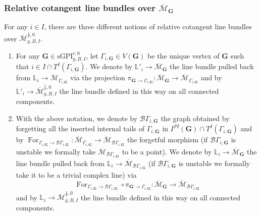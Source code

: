 \documentclass[11pt]{amsart}
\theoremstyle{definition}
\theoremstyle{remark}
\newcommand{\<}{\left<}
\renewcommand{\>}{\right>}
\numberwithin{equation}{section}
\def\Mbar{{\overline{\mathcal M}}}
\def\sGPI{\text{sGPI}}
\begin{document}
\subsubsection{Relative cotangent line bundles over $\Mbar_\mathbf{G}$}\label{sec uni cotangent line over glued moduli}
For any $i\in I$, there are three different notions of relative cotangent line bundles over $\Mbar^{\frac{1}{r},0}_{g,B,I}$.
\begin{enumerate}
    \item 
    For any $\bm{G} \in \sGPI^{r,0}_{g,B,I}$, let $\Gamma_{i,\bm{G}}\in V(\bm{G})$ be the unique vertex of $\bm{G}$ such that %
$i\in I \cap T^I(\Gamma_{i,\bm{G}})$. We denote %
by $\mathbb L'_i\to \Mbar_{\bm{G}}$ the line bundle pulled back from $\mathbb L_i\to \Mbar_{\Gamma_{i,\bm{G}}}$ via the projection %
$\pi_{\bm{G}\to \Gamma_{i,\bm{G}}}\colon \Mbar_{\bm{G}}\to \Mbar_{\Gamma_{i,\bm{G}}}$ and %
by $\mathbb L'_i\to \Mbar^{\frac{1}{r},0}_{g,B,I}$ the line bundle defined in this way on all connected components.
    \item With the above notation, we denote by $\mathcal B \Gamma_{i,\bm{G}}$ the graph obtained by forgetting all the inserted internal tails of $\Gamma_{i,\bm{G}}$ in $I^{PI}(\bm{G})\cap T^I(\Gamma_{i,\bm{G}})$ and by $\operatorname{For}_{\Gamma_{i,\bm{G}}\to \mathcal B\Gamma_{i,\bm{G}}}\colon \Mbar_{\Gamma_{i,\bm{G}}}\to \Mbar_{\mathcal B \Gamma_{i,\bm{G}}}$ the forgetful morphism (if $\mathcal B \Gamma_{i,\bm{G}}$ is unstable we formally take $\Mbar_{\mathcal B \Gamma_{i,\bm{G}}}$ to be a point). We denote by $\mathbb L_i\to \Mbar_{\bm{G}}$ the line bundle pulled back from $\mathbb L_i\to \Mbar_{\mathcal B\Gamma_{i,\bm{G}}}$ (if $\mathcal B \Gamma_{i,\bm{G}}$ is unstable we formally take it to be a trivial complex line) via 
    $$\operatorname{For}_{\Gamma_{i,\bm{G}}\to \mathcal B\Gamma_{i,\bm{G}}}\circ \pi_{\bm{G}\to \Gamma_{i,\bm{G}}} \colon \Mbar_{\bm{G}} \to \Mbar_{\mathcal B\Gamma_{i,\bm{G}}}$$ 
    and by $\mathbb L_i\to \Mbar^{\frac{1}{r},0}_{g,B,I}$ the line bundle defined in this way on all connected components.


\end{enumerate}
\end{document}
